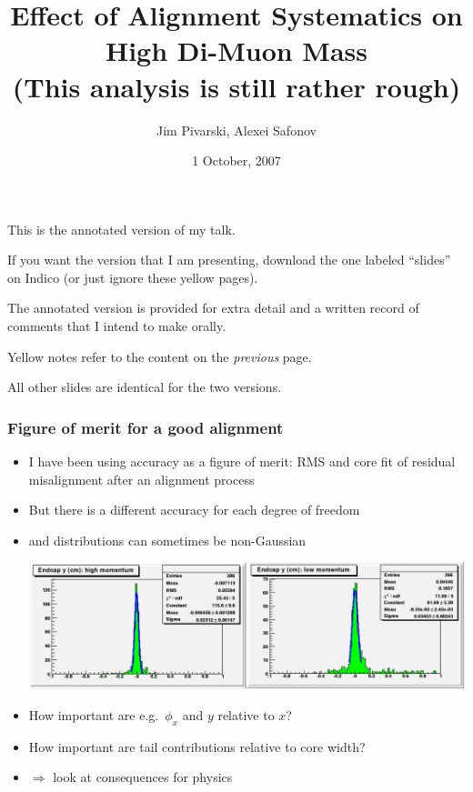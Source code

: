 \documentclass[compress]{beamer}
\title{Effect of Alignment Systematics on High Di-Muon Mass \\ (This analysis is still rather rough)}
\author{Jim Pivarski, Alexei Safonov}
\institute{Texas A\&M University}
\date{ 1 October, 2007}
\begin{document}
\frame{\titlepage}

\begin{notes}
\item This is the annotated version of my talk.
\item If you want the version that I am presenting, download the one
labeled ``slides'' on Indico (or just ignore these yellow pages).
\item The annotated version is provided for extra detail and a written
record of comments that I intend to make orally.
\item Yellow notes refer to the content on the {\it previous} page.
\item All other slides are identical for the two versions.
\end{notes}

\begin{frame}
\frametitle{Figure of merit for a good alignment}

\begin{itemize}
\item I have been using accuracy as a figure of merit: RMS and core
fit of residual misalignment after an alignment process
\item But there is a different accuracy for each degree of freedom
\item and distributions can sometimes be non-Gaussian

\includegraphics[width=\linewidth]{momentum_accuracy.png}

\item How important are e.g.\ $\phi_x$ and $y$ relative to $x$?

\item How important are tail contributions relative to core width?

\item $\Rightarrow$ look at consequences for physics
\end{itemize}
\end{frame}
\end{document}
